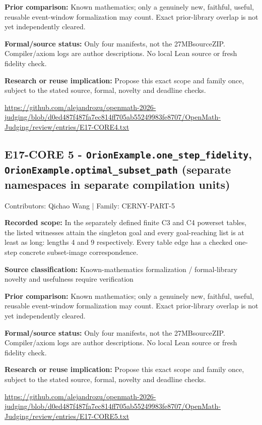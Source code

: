 \documentclass[11pt,a4paper]{article}
\begin{document}
\textbf{Prior comparison:} Known mathematics; only a genuinely new, faithful, useful, reusable event-window formalization may count. Exact prior-library overlap is not yet independently cleared.

\textbf{Formal/source status:} Only four manifests, not the 27MBsourceZIP. Compiler/axiom logs are author descriptions. No local Lean source or fresh fidelity check.

\textbf{Research or reuse implication:} Propose this exact scope and family once, subject to the stated source, formal, novelty and deadline checks.

{\small \url{https://github.com/alejandrozu/openmath-2026-judging/blob/d0ed487f487fa7ec814ff705ab55249983fe8707/OpenMath-Judging/review/entries/E17-CORE4.txt}\par}

\begin{samepage}
\subsection{E17-CORE 5  -  \texttt{OrionExample.one\_step\_fidelity}, \texttt{OrionExample.optimal\_subset\_path} (separate namespaces in separate compilation units)}
{\small Contributors: Qichao Wang | Family: CERNY-PART-5\par}

\textbf{Recorded scope:} In the separately defined finite C3 and C4 powerset tables, the listed witnesses attain the singleton goal and every goal-reaching list is at least as long: lengths 4 and 9 respectively. Every table edge has a checked one-step concrete subset-image correspondence.

\end{samepage}
\textbf{Source classification:} Known-mathematics formalization / formal-library novelty and usefulness require verification

\textbf{Prior comparison:} Known mathematics; only a genuinely new, faithful, useful, reusable event-window formalization may count. Exact prior-library overlap is not yet independently cleared.

\textbf{Formal/source status:} Only four manifests, not the 27MBsourceZIP. Compiler/axiom logs are author descriptions. No local Lean source or fresh fidelity check.

\textbf{Research or reuse implication:} Propose this exact scope and family once, subject to the stated source, formal, novelty and deadline checks.

{\small \url{https://github.com/alejandrozu/openmath-2026-judging/blob/d0ed487f487fa7ec814ff705ab55249983fe8707/OpenMath-Judging/review/entries/E17-CORE5.txt}\par}
\end{document}
